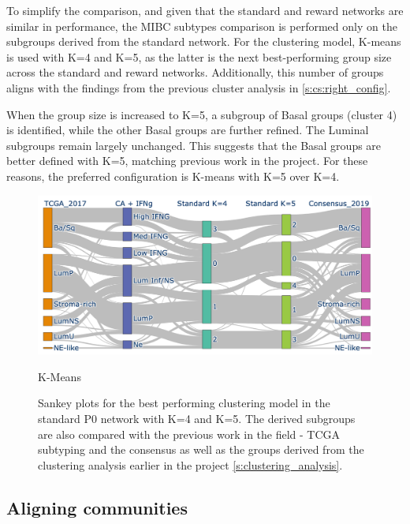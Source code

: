 To simplify the comparison, and given that the standard and reward networks are similar in performance, the MIBC subtypes comparison is performed only on the subgroups derived from the standard network. For the clustering model, K-means is used with K=4 and K=5, as the latter is the next best-performing group size across the standard and reward networks. Additionally, this number of groups aligns with the findings from the previous cluster analysis in \cref{s:cs:right_config}.

When the group size is increased to K=5, a subgroup of Basal groups (cluster 4) is identified, while the other Basal groups are further refined. The Luminal subgroups remain largely unchanged. This suggests that the Basal groups are better defined with K=5, matching previous work in the project. For these reasons, the preferred configuration is K-means with K=5 over K=4.



\begin{figure}[!htb]
    \centering
    \includegraphics[width=\textwidth,keepaspectratio]{Sections/Network_I/Resources/P0/clustering/Sankey_KM_4K_v3.png}
    \caption{K-Means}
    \caption[P0 network derived clusters comparisons with others]{Sankey plots for the best performing clustering model in the standard P0 network with K=4 and K=5. The derived subgroups are also compared with the previous work in the field - TCGA subtyping \citep{Robertson2017-mg} and the consensus \citet{Kamoun2020-tj} as well as the groups derived from the clustering analysis earlier in the project \cref{s:clustering_analysis}. }
    \label{fig:N_I:p0_sky_KMeans}
\end{figure}





\subsection{Aligning communities} \label{s:ap:align_coms}

